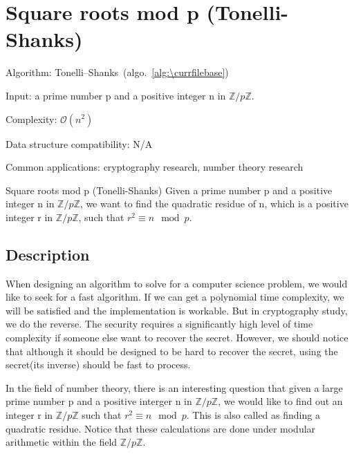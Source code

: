 \documentclass[catalog.tex]{subfiles}
\begin{document}
\def\pbname{Square roots mod p (Tonelli-Shanks)} %

\section{\pbname} 

\begin{overview}
\item [Algorithm:] Tonelli–Shanks~(algo.~\ref{alg:\currfilebase}) 
\item [Input:] a prime number p and a positive integer n in $\mathbb{Z} / p \mathbb{Z}$.
\item [Complexity:] $\mathcal{O}(n^2)$
\item [Data structure compatibility:] N/A
\item [Common applications:] cryptography research, number theory research
\end{overview}

\begin{problem}{\pbname}
	Given a prime number p and a positive integer n in $\mathbb{Z} / p \mathbb{Z}$, we want to find the quadratic residue of n, which is a positive integer r in $\mathbb{Z} / p \mathbb{Z}$, such that $r^2 \equiv n \mod p$. 
\end{problem}


\subsection*{Description}
When designing an algorithm to solve for a computer science problem, we would like to seek for a fast algorithm. If we can get a polynomial time complexity, we will be satisfied and the implementation is workable. But in cryptography study, we do the reverse. The security requires a significantly high level of time complexity if someone else want to recover the secret. However, we should notice that although it should be designed to be hard to recover the secret, using the secret(its inverse) should be fast to process. \newline

In the field of number theory, there is an interesting question that given a large prime number p and a positive interger n in $\mathbb{Z} / p \mathbb{Z}$, we would like to find out an integer r in $\mathbb{Z} / p \mathbb{Z}$ such that $r^2 \equiv n \mod p$. This is also called as finding a quadratic residue. Notice that these calculations are done under modular arithmetic within the field $\mathbb{Z} / p \mathbb{Z}$.\newline
\end{document}
